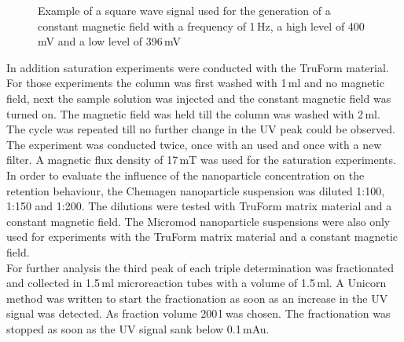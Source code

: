 \begin{figure}[h]
\centering

\caption[Example of a square wave signal]{Example of a square wave signal used for the generation of a constant magnetic field with a frequency of 1\,Hz, a high level of 400\,mV and a low level of 396\,mV
\label{fig:waveform}
}
\end{figure}


In addition saturation experiments were conducted with the TruForm material. For those experiments the column was first washed with 1\,ml and no magnetic field, next the sample solution was injected and the constant magnetic field was turned on. The magnetic field was held till the column was washed with 2\,ml. The cycle was repeated till no further change in the UV peak could be observed. The experiment was conducted twice, once with an used and once with a new filter. A magnetic flux density of 17\,mT was used for the saturation experiments.\\
In order to evaluate the influence of the nanoparticle concentration on the retention behaviour, the Chemagen nanoparticle suspension was diluted 1:100, 1:150 and 1:200. The dilutions were tested with TruForm matrix material and a constant magnetic field. The Micromod nanoparticle suspensions were also only used for experiments with the TruForm matrix material and a constant magnetic field.\\
For further analysis the third peak of each triple determination was fractionated and collected in 1.5\,ml microreaction tubes with a volume of 1.5\,ml. A Unicorn method was written to start the fractionation as soon as an increase in the UV signal was detected. As fraction volume 200\,\textmu l was chosen. The fractionation was stopped as soon as the UV signal sank below 0.1\,mAu. 
 

